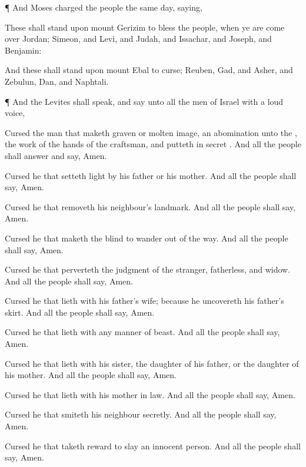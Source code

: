 {\par }{\PP {}¶ And
Moses
charged the
people the same
day,
saying,

These shall
stand upon
mount
Gerizim to
bless the
people, when ye are come
over
Jordan;
Simeon, and
Levi, and
Judah, and
Issachar, and
Joseph, and
Benjamin:

And these shall
stand upon
mount
Ebal to
curse;
Reuben,
Gad, and
Asher, and
Zebulun,
Dan, and
Naphtali.


\par }{\PP {}¶ And the
Levites shall
speak, and
say unto all the
men of
Israel with a
loud
voice,

Cursed
{} the
man that
maketh
{}
graven or molten
image, an
abomination unto the
{}, the
work of the
hands of the
craftsman, and
putteth
{} in
{}
secret
{}. And all the
people shall
answer and
say,
Amen.

Cursed
{} he that setteth
light by his
father or his
mother. And all the
people shall
say,
Amen.

Cursed
{} he that
removeth his
neighbour’s
landmark. And all the
people shall
say,
Amen.

Cursed
{} he that maketh the
blind to
wander out of the
way. And all the
people shall
say,
Amen.

Cursed
{} he that
perverteth the
judgment of the
stranger,
fatherless, and
widow. And all the
people shall
say,
Amen.

Cursed
{} he that
lieth with his
father’s
wife; because he
uncovereth his
father’s
skirt. And all the
people shall
say,
Amen.

Cursed
{} he that
lieth with any manner of
beast. And all the
people shall
say,
Amen.

Cursed
{} he that
lieth with his
sister, the
daughter of his
father, or the
daughter of his
mother. And all the
people shall
say,
Amen.

Cursed
{} he that
lieth with his mother in
law. And all the
people shall
say,
Amen.

Cursed
{} he that
smiteth his
neighbour
secretly. And all the
people shall
say,
Amen.

Cursed
{} he that
taketh
reward to
slay an
innocent
person. And all the
people shall
say,
Amen.

}
